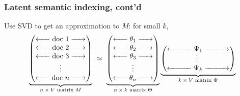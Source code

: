 \documentclass[smaller,handout]{beamer}
\def\darkred{\color{red!70!black}}
\begin{document}
\begin{frame}
\frametitle{Latent semantic indexing, cont'd}

{\darkred Use SVD to get an approximation to $M$: for small $k$,}
$$
\underbrace{\begin{pmatrix} 
\xleftarrow{\hspace*{.5cm}} \text{doc 1} \xrightarrow{\hspace*{.5cm}} \\
\xleftarrow{\hspace*{.5cm}} \text{doc 2} \xrightarrow{\hspace*{.5cm}} \\
\xleftarrow{\hspace*{.5cm}} \text{doc 3} \xrightarrow{\hspace*{.5cm}} \\
\vdots \\
\xleftarrow{\hspace*{.5cm}} \text{doc $n$} \xrightarrow{\hspace*{.5cm}} 
\end{pmatrix}}_{\text{$n \times V$ matrix $M$}}
\ \approx \ 
\underbrace{\begin{pmatrix}
\xleftarrow{\hspace*{0.5cm}} \theta_1 \xrightarrow{\hspace*{0.5cm}} \\
\xleftarrow{\hspace*{0.5cm}} \theta_2 \xrightarrow{\hspace*{0.5cm}} \\
\xleftarrow{\hspace*{0.5cm}} \theta_3 \xrightarrow{\hspace*{0.5cm}} \\
\vdots \\
\xleftarrow{\hspace*{0.5cm}} \theta_n \xrightarrow{\hspace*{0.5cm}} 
\end{pmatrix}}_{\text{$n \times k$ matrix $\Theta$}}
\underbrace{\begin{pmatrix} 
\xleftarrow{\hspace*{1cm}} \Psi_1 \xrightarrow{\hspace*{1cm}} \\[-.05in]
\vdots \  \\
\xleftarrow{\hspace*{1cm}} \Psi_k \xrightarrow{\hspace*{1cm}} 
\end{pmatrix}}_{\text{$k \times V$ matrix $\Psi$}}
$$


\end{frame}
\end{document}
